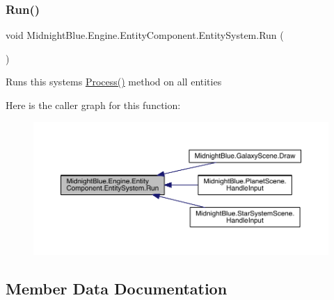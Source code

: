 \subsubsection{\texorpdfstring{Run()}{Run()}}
{\footnotesize\ttfamily void Midnight\+Blue.\+Engine.\+Entity\+Component.\+Entity\+System.\+Run (\begin{DoxyParamCaption}{ }\end{DoxyParamCaption})\hspace{0.3cm}{\ttfamily [inline]}}



Runs this systems \hyperlink{class_midnight_blue_1_1_engine_1_1_entity_component_1_1_entity_system_a94aa715ac6bfe9a720c3d12d56c7598c}{Process()} method on all entities 

Here is the caller graph for this function\+:
\nopagebreak
\begin{figure}[H]
\begin{center}
\leavevmode
\includegraphics[width=350pt]{class_midnight_blue_1_1_engine_1_1_entity_component_1_1_entity_system_af884989f1949c20caac534892784375a_icgraph}
\end{center}
\end{figure}


\subsection{Member Data Documentation}
\hypertarget{class_midnight_blue_1_1_engine_1_1_entity_component_1_1_entity_system_a938cb3fb0fca73406472f0c44be8641e}{}\label{class_midnight_blue_1_1_engine_1_1_entity_component_1_1_entity_system_a938cb3fb0fca73406472f0c44be8641e} 

